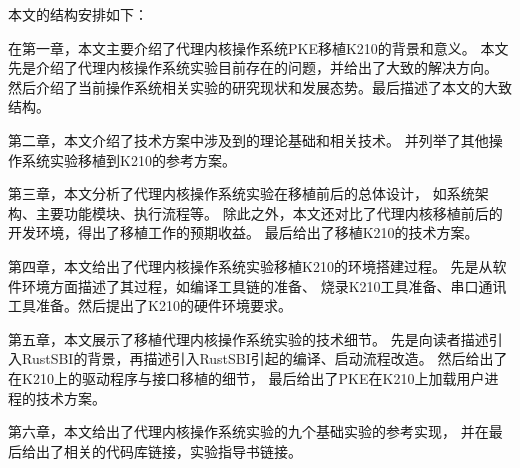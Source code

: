 本文的结构安排如下：

在第一章，本文主要介绍了代理内核操作系统PKE移植K210的背景和意义。
本文先是介绍了代理内核操作系统实验目前存在的问题，并给出了大致的解决方向。
然后介绍了当前操作系统相关实验的研究现状和发展态势。最后描述了本文的大致结构。

第二章，本文介绍了技术方案中涉及到的理论基础和相关技术。
并列举了其他操作系统实验移植到K210的参考方案。

第三章，本文分析了代理内核操作系统实验在移植前后的总体设计，
如系统架构、主要功能模块、执行流程等。
除此之外，本文还对比了代理内核移植前后的开发环境，得出了移植工作的预期收益。
最后给出了移植K210的技术方案。

第四章，本文给出了代理内核操作系统实验移植K210的环境搭建过程。
先是从软件环境方面描述了其过程，如编译工具链的准备、
烧录K210工具准备、串口通讯工具准备。然后提出了K210的硬件环境要求。

第五章，本文展示了移植代理内核操作系统实验的技术细节。
先是向读者描述引入RustSBI的背景，再描述引入RustSBI引起的编译、启动流程改造。
然后给出了在K210上的驱动程序与接口移植的细节，
最后给出了PKE在K210上加载用户进程的技术方案。

第六章，本文给出了代理内核操作系统实验的九个基础实验的参考实现，
并在最后给出了相关的代码库链接，实验指导书链接。


